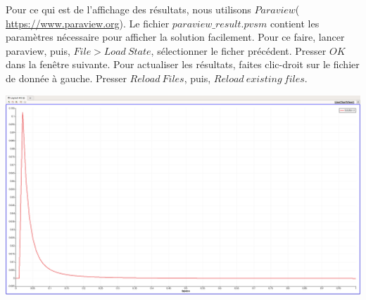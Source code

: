 \documentclass[a4paper,french,10pt]{article}
\begin{document}
    Pour ce qui est de l'affichage des résultats, nous utilisons $Paraview$( \url{https://www.paraview.org}). Le fichier $paraview\_result.pvsm$ contient les paramètres nécessaire pour afficher la solution facilement. Pour ce faire, lancer paraview, puis, $File>Load~State$, sélectionner le ficher précédent. Presser $OK$ dans la fenêtre suivante. Pour actualiser les résultats, faites clic-droit sur le fichier de donnée à gauche. Presser $Reload ~Files$, puis, $Reload~existing~files$.
    
    
 \includegraphics[scale=0.2]{image.png}
\end{document}
